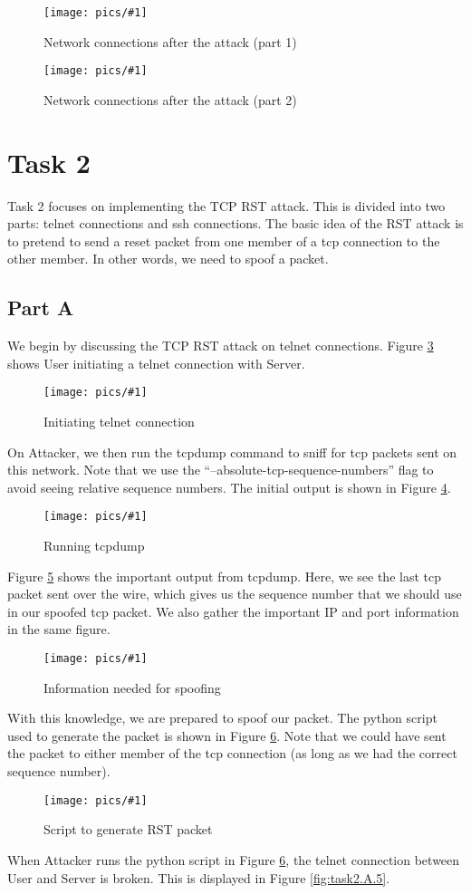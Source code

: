 \documentclass[11pt]{article}
\newcommand{\fig}[2]{ 
\begin{figure}[h]
	\centering
	\caption{#2}
	\texttt{[image: pics/\#1]}
	\label{fig:#1}
\end{figure} 
}
\begin{document}
\fig{task1.2}{Network connections after the attack (part 1)}

\fig{task1.3}{Network connections after the attack (part 2)}

\newpage
\section*{Task 2}

Task 2 focuses on implementing the TCP RST attack. This is divided into two parts: telnet connections and ssh connections. The basic idea of the RST attack is to pretend to send a reset packet from one member of a tcp connection to the other member. In other words, we need to spoof a packet.

\subsection*{Part A}

We begin by discussing the TCP RST attack on telnet connections. Figure \ref{fig:task2.A.1} shows User initiating a telnet connection with Server.

\fig{task2.A.1}{Initiating telnet connection}

On Attacker, we then run the tcpdump command to sniff for tcp packets sent on this network. Note that we use the ``--absolute-tcp-sequence-numbers'' flag to avoid seeing relative sequence numbers. The initial output is shown in Figure \ref{fig:task2.A.2}.

\fig{task2.A.2}{Running tcpdump}

Figure \ref{fig:task2.A.3} shows the important output from tcpdump. Here, we see the last tcp packet sent over the wire, which gives us the sequence number that we should use in our spoofed tcp packet. We also gather the important IP and port information in the same figure.

\fig{task2.A.3}{Information needed for spoofing}

\newpage
With this knowledge, we are prepared to spoof our packet. The python script used to generate the packet is shown in Figure \ref{fig:task2.A.4}. Note that we could have sent the packet to either member of the tcp connection (as long as we had the correct sequence number).

\fig{task2.A.4}{Script to generate RST packet}

When Attacker runs the python script in Figure \ref{fig:task2.A.4}, the telnet connection between User and Server is broken. This is displayed in Figure \ref{fig:task2.A.5}.
\end{document}
